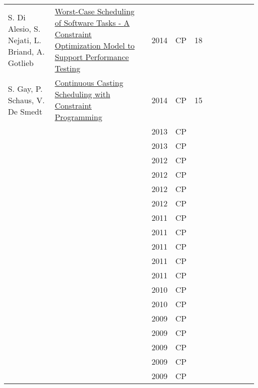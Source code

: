\documentclass[a4paper]{article}
\begin{document}
{\begin{longtable}{p{3cm}p{6cm}rrcrlcccp{1.5cm}l}
S. {Di Alesio}, S. Nejati, L. Briand, A. Gotlieb& \href{papers/AlesioNBG14.pdf}{Worst-Case Scheduling of Software Tasks - {A} Constraint Optimization Model to Support Performance Testing} & \cite{AlesioNBG14} & 2014 & CP & 18 & & & & & & \\
S. Gay, P. Schaus, V. De Smedt& \href{papers/GaySS14.pdf}{Continuous Casting Scheduling with Constraint Programming} & \cite{GaySS14} & 2014 & CP & 15 & & & & & & \\
& \href{papers/OuelletQ13.pdf}{} & \cite{OuelletQ13} & 2013 & CP & & & & & & & \\
& \href{papers/SchuttFS13.pdf}{} & \cite{SchuttFS13} & 2013 & CP & & & & & & & \\
& \href{papers/SimoninAHL12.pdf}{} & \cite{SimoninAHL12} & 2012 & CP & & & & & & & \\
& \href{papers/LetortBC12.pdf}{} & \cite{LetortBC12} & 2012 & CP & & & & & & & \\
& \href{papers/SerraNM12.pdf}{} & \cite{SerraNM12} & 2012 & CP & & & & & & & \\
& \href{papers/IfrimOS12.pdf}{} & \cite{IfrimOS12} & 2012 & CP & & & & & & & \\
& \href{papers/HermenierDL11.pdf}{} & \cite{HermenierDL11} & 2011 & CP & & & & & & & \\
& \href{papers/BonfiettiLBM11.pdf}{} & \cite{BonfiettiLBM11} & 2011 & CP & & & & & & & \\
& \href{papers/ClercqPBJ11.pdf}{} & \cite{ClercqPBJ11} & 2011 & CP & & & & & & & \\
& \href{papers/GrimesH11.pdf}{} & \cite{GrimesH11} & 2011 & CP & & & & & & & \\
& \href{papers/KameugneFSN11.pdf}{} & \cite{KameugneFSN11} & 2011 & CP & & & & & & & \\
& \href{papers/LombardiM10.pdf}{} & \cite{LombardiM10} & 2010 & CP & & & & & & & \\
& \href{papers/SchuttW10.pdf}{} & \cite{SchuttW10} & 2010 & CP & & & & & & & \\
& \href{papers/Baptiste09.pdf}{} & \cite{Baptiste09} & 2009 & CP & & & & & & & \\
& \href{papers/GrimesHM09.pdf}{} & \cite{GrimesHM09} & 2009 & CP & & & & & & & \\
& \href{papers/LombardiM09.pdf}{} & \cite{LombardiM09} & 2009 & CP & & & & & & & \\
& \href{papers/SchuttFSW09.pdf}{} & \cite{SchuttFSW09} & 2009 & CP & & & & & & & \\
& \href{papers/Vilim09.pdf}{} & \cite{Vilim09} & 2009 & CP & & & & & & & \\

\end{longtable}}
\end{document}
